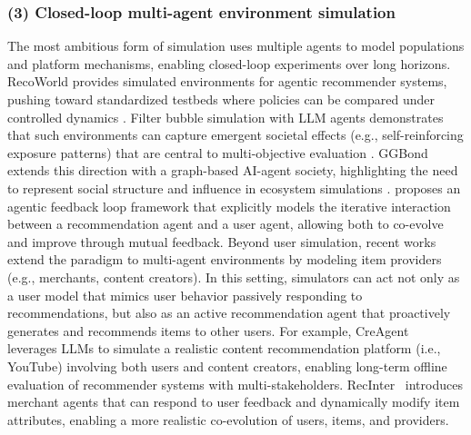 \subsubsection{\textbf{(3) Closed-loop multi-agent environment simulation}}\label{subsubsec:simulation-closed-loop-multi-agent-environment}
The most ambitious form of simulation uses multiple agents to model populations and platform mechanisms, enabling closed-loop experiments over long horizons.
RecoWorld provides simulated environments for agentic recommender systems, pushing toward standardized testbeds where policies can be compared under controlled dynamics \cite{liu2025recoworld}.
Filter bubble simulation with LLM agents demonstrates that such environments can capture emergent societal effects (e.g., self-reinforcing exposure patterns) that are central to multi-objective evaluation \cite{sukiennik2025simulating}. 
GGBond extends this direction with a graph-based AI-agent society, highlighting the need to represent social structure and influence in ecosystem simulations \cite{zhong2025ggbond}. 
\citet{cai2025agentic} proposes an agentic feedback loop framework that explicitly models the iterative interaction between a recommendation agent and a user agent, allowing both to co-evolve and improve through mutual feedback.
Beyond user simulation, recent works extend the paradigm to multi-agent environments by modeling item providers  (e.g., merchants, content creators). In this setting, simulators can act not only as a user model that mimics user behavior passively responding to recommendations, but also as an active recommendation agent that proactively generates and recommends items to other users. For example, CreAgent~\cite{ye2025creagent} leverages LLMs to simulate a realistic content recommendation platform (i.e., YouTube) involving both users and content creators, enabling long-term offline evaluation of recommender systems with multi-stakeholders. RecInter~\cite{jin2025recinter} introduces merchant agents that can respond to user feedback and dynamically modify item attributes, enabling a more realistic co-evolution of users, items, and providers. 




